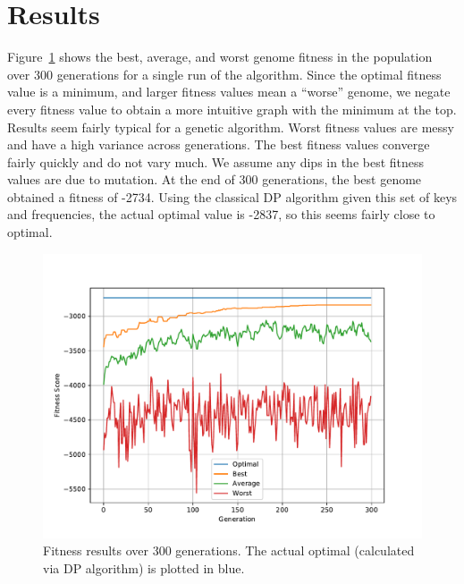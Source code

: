 
\section{Results}

Figure~\ref{fig:results} shows the best, average, and worst genome fitness in the population over 300 generations for a single run of the algorithm. Since the optimal fitness value is a minimum, and larger fitness values mean a ``worse'' genome, we negate every fitness value to obtain a more intuitive graph with the minimum at the top. Results seem fairly typical for a genetic algorithm. Worst fitness values are messy and have a high variance across generations. The best fitness values converge fairly quickly and do not vary much. We assume any dips in the best fitness values are due to mutation. At the end of 300 generations, the best genome obtained a fitness of -2734. Using the classical  DP algorithm given this set of keys and frequencies, the actual optimal value is -2837, so this seems fairly close to optimal.

\begin{figure}[h]
    \centering
    \includegraphics[scale=0.8]{figures/results.pdf}
    \caption{ \small Fitness results over 300 generations. The actual optimal (calculated via DP algorithm) is plotted in blue.}
    \label{fig:results}
\end{figure}
